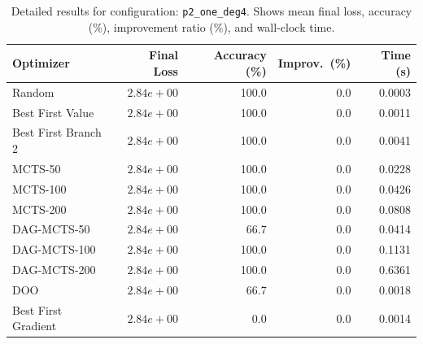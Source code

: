 \begin{table}[H]
\centering
\caption{Detailed results for configuration: \texttt{p2\_one\_deg4}. Shows mean final loss, accuracy (\%), improvement ratio (\%), and wall-clock time.}
\label{tab:funclearn-detail-6}
\begin{tabular}{lrrrr}
\toprule
Optimizer & Final Loss & Accuracy (\%) & Improv.~(\%) & Time (s) \\
\midrule
Random & \textbf{$2.84e+00$} & 100.0 & 0.0 & 0.0003 \\
\hline
Best First Value & \textbf{$2.84e+00$} & 100.0 & 0.0 & 0.0011 \\
\hline
Best First Branch 2 & \textbf{$2.84e+00$} & 100.0 & 0.0 & 0.0041 \\
\hline
MCTS-50 & \textbf{$2.84e+00$} & 100.0 & 0.0 & 0.0228 \\
\hline
MCTS-100 & \textbf{$2.84e+00$} & 100.0 & 0.0 & 0.0426 \\
\hline
MCTS-200 & \textbf{$2.84e+00$} & 100.0 & 0.0 & 0.0808 \\
\hline
DAG-MCTS-50 & \textbf{$2.84e+00$} & 66.7 & 0.0 & 0.0414 \\
\hline
DAG-MCTS-100 & \textbf{$2.84e+00$} & 100.0 & 0.0 & 0.1131 \\
\hline
DAG-MCTS-200 & \textbf{$2.84e+00$} & 100.0 & 0.0 & 0.6361 \\
\hline
DOO & \textbf{$2.84e+00$} & 66.7 & 0.0 & 0.0018 \\
\hline
Best First Gradient & \textbf{$2.84e+00$} & 0.0 & 0.0 & 0.0014 \\
\bottomrule
\end{tabular}
\end{table}

